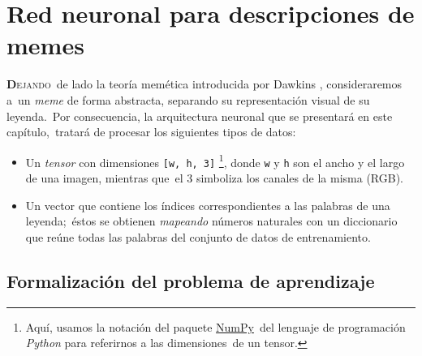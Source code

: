 \chapter{Red neuronal para descripciones de memes}

\noindent
\lettrine[lines=2, lhang=0.33, loversize=0.25]{\textbf{D}}{ejando}\
de lado la teoría memética introducida por Dawkins \cite{dawkins2006}, consideraremos a\
un \emph{meme} de forma abstracta, separando su representación visual de su leyenda.\
Por consecuencia, la arquitectura neuronal que se presentará en este capítulo,\
tratará de procesar los siguientes tipos de datos:
\begin{itemize}
\item Un \emph{tensor} con dimensiones \verb+[w, h, 3]+
  \footnote{
    Aquí, usamos la notación del paquete \href{http://www.numpy.org}{NumPy}\
    del lenguaje de programación \emph{Python} para referirnos a las dimensiones\
    de un tensor.
  }, donde \verb+w+ y \verb+h+ son el ancho y el largo de una imagen, mientras que\
  el 3 simboliza los canales de la misma (RGB).
\item Un vector que contiene los índices correspondientes a las palabras de una leyenda;\
  éstos se obtienen \textit{mapeando} números naturales con un diccionario que reúne todas
  las palabras del conjunto de datos de entrenamiento.
\end{itemize}

\section{Formalización del problema de aprendizaje}

